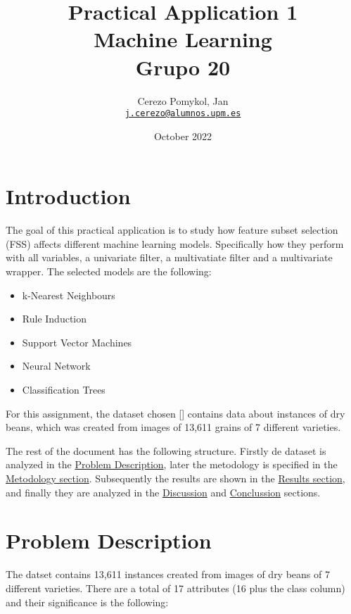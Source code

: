 \documentclass[a4paper,11pt]{article}
\author{
	\Large Cerezo Pomykol, Jan\\ \href{mailto:j.cerezo@alumnos.upm.es}{\small\texttt{j.cerezo@alumnos.upm.es}}
}
\title{\textbf{\Huge Practical Application 1} \\
		\Large Machine Learning \\
		Grupo 20}
\date{\Large October 2022}
\begin{document}
\maketitle
\vfill

\tableofcontents
\newpage

\section{Introduction}
\label{sec:introduction}

The goal of this practical application is to study how feature subset selection (FSS) affects different machine learning models. Specifically how they perform with all variables, a univariate filter, a multivatiate filter and a multivariate wrapper. The selected models are the following:

\begin{itemize}
\item k-Nearest Neighbours
\item Rule Induction
\item Support Vector Machines
\item Neural Network
\item Classification Trees
\end{itemize}

For this assignment, the dataset chosen [] contains data about instances of dry beans, which was created from images of 13,611 grains of 7 different varieties.

The rest of the document has the following structure. Firstly de dataset is analyzed in the \hyperref[sec:problem]{Problem Description}, later the metodology is specified in the \hyperref[sec:metodology]{Metodology section}. Subsequently the results are shown in the \hyperref[sec:results]{Results section}, and finally they are analyzed in the \hyperref[sec:discussion]{Discussion} and \hyperref[sec:conclusion]{Conclussion} sections.

\section{Problem Description}
\label{sec:problem}

The datset contains 13,611 instances created from images of dry beans of 7 different varieties. There are a total of 17 attributes (16 plus the class column) and their significance is the following:
\end{document}
